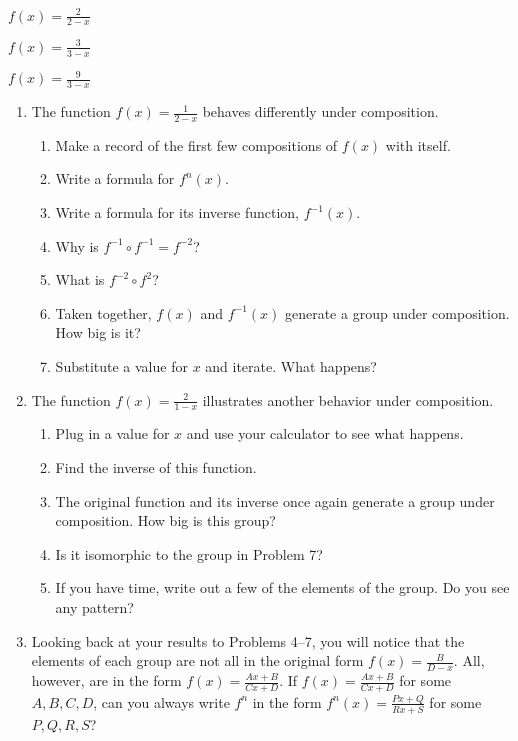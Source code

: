 \documentclass[../gatm.tex]{subfiles}
\begin{document}
\begin{enumerate}
\begin{multicols}{3}
\setcounter{enumi}{\value{problem_i}}
\item \label{prob:compose_start}$f(x)=\frac{2}{2-x}$
\item $f(x)=\frac{3}{3-x}$
\item \label{prob:compose_end}$f(x)=\frac{9}{3-x}$
\setcounter{problem_i}{\value{enumi}}
\end{multicols}
\end{enumerate}
\begin{enumerate}
\setcounter{enumi}{\value{problem_i}}
\item The function $f(x)=\frac{1}{2-x}$ behaves differently under composition.
\begin{enumerate}
\item Make a record of the first few compositions of $f(x)$ with itself.
\item Write a formula for $f^n(x)$.
\item Write a formula for its inverse function, $f^{-1}(x)$.
\item Why is $f^{-1}\circ f^{-1}=f^{-2}$?
\item What is $f^{-2}\circ f^2$?
\item Taken together, $f(x)$ and $f^{-1}(x)$ generate a group under composition. How big is it?
\item Substitute a value for $x$ and iterate. What happens?
\end{enumerate}
\item The function $f(x)=\frac{2}{1-x}$ illustrates another behavior under composition.
\begin{enumerate}
\item Plug in a value for $x$ and use your calculator to see what happens.
\item Find the inverse of this function.
\item The original function and its inverse once again generate a group under composition. How big is this group?
\item Is it isomorphic to the group in Problem 7?
\item If you have time, write out a few of the elements of the group. Do you see any pattern?
\end{enumerate}
\item Looking back at your results to Problems 4--7, you will notice that the elements of each group are not all in the original form $f(x)=\frac{B}{D-x}$. All, however, are in the form $f(x)=\frac{Ax+B}{Cx+D}$. If $f(x)=\frac{Ax+B}{Cx+D}$ for some $A,B,C,D$, can you always write $f^n$ in the form $f^n(x)=\frac{Px+Q}{Rx+S}$ for some $P,Q,R,S$?
\setcounter{problem_i}{\value{enumi}}
\end{enumerate}
\end{document}
